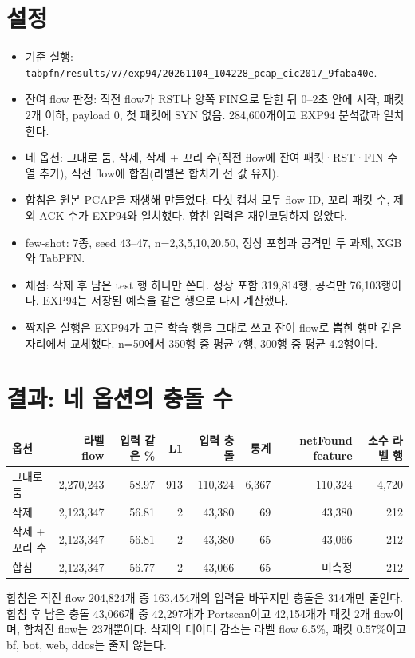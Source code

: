 \section{설정}
\begin{itemize}
\item 기준 실행: \texttt{tabpfn/results/v7/exp94/20261104\_104228\_pcap\_cic2017\_9faba40e}.
\item 잔여 flow 판정: 직전 flow가 RST나 양쪽 FIN으로 닫힌 뒤 0--2초 안에 시작, 패킷 2개 이하, payload 0, 첫 패킷에 SYN 없음. 284,600개이고 EXP94 분석값과 일치한다.
\item 네 옵션: 그대로 둠, 삭제, 삭제 + 꼬리 수(직전 flow에 잔여 패킷·RST·FIN 수 열 추가), 직전 flow에 합침(라벨은 합치기 전 값 유지).
\item 합침은 원본 PCAP을 재생해 만들었다. 다섯 캡처 모두 flow ID, 꼬리 패킷 수, 제외 ACK 수가 EXP94와 일치했다. 합친 입력은 재인코딩하지 않았다.
\item few-shot: 7종, seed 43--47, n=2,3,5,10,20,50, 정상 포함과 공격만 두 과제, XGB와 TabPFN.
\item 채점: 삭제 후 남은 test 행 하나만 쓴다. 정상 포함 319,814행, 공격만 76,103행이다. EXP94는 저장된 예측을 같은 행으로 다시 계산했다.
\item 짝지은 실행은 EXP94가 고른 학습 행을 그대로 쓰고 잔여 flow로 뽑힌 행만 같은 자리에서 교체했다. n=50에서 350행 중 평균 7행, 300행 중 평균 4.2행이다.
\end{itemize}

\section{결과: 네 옵션의 충돌 수}
\begin{center}\small
\begin{tabular}{lrrrrrrr}
\toprule
옵션 & 라벨 flow & 입력 같은 \% & L1 & 입력 충돌 & 통계 & netFound feature & 소수 라벨 행\\\midrule
그대로 둠 & 2,270,243 & 58.97 & 913 & 110,324 & 6,367 & 110,324 & 4,720\\
삭제 & 2,123,347 & 56.81 & 2 & 43,380 & 69 & 43,380 & 212\\
삭제 + 꼬리 수 & 2,123,347 & 56.81 & 2 & 43,380 & 65 & 43,066 & 212\\
합침 & 2,123,347 & 56.77 & 2 & 43,066 & 65 & 미측정 & 212\\
\bottomrule
\end{tabular}
\end{center}
합침은 직전 flow 204,824개 중 163,454개의 입력을 바꾸지만 충돌은 314개만 줄인다. 합침 후 남은 충돌 43,066개 중 42,297개가 Portscan이고 42,154개가 패킷 2개 flow이며, 합쳐진 flow는 23개뿐이다. 삭제의 데이터 감소는 라벨 flow 6.5\%, 패킷 0.57\%이고 bf, bot, web, ddos는 줄지 않는다.

